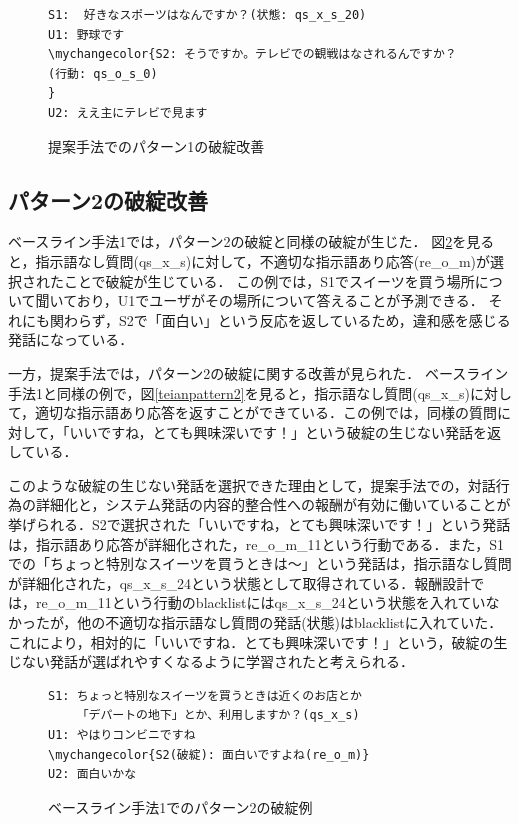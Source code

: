 \documentclass[12pt,a4paper,twoside,openany]{jbook}
\newcommand\mychangecolor[1]{\textcolor[rgb]{1,0,0}{\textbf{#1}}}
\begin{document}
\begin{figure}[htb]
\centering
\begin{screen}
\begin{Verbatim}[commandchars=\\\{\}]
S1:  好きなスポーツはなんですか？(状態: qs_x_s_20)
U1: 野球です
\mychangecolor{S2: そうですか。テレビでの観戦はなされるんですか？(行動: qs_o_s_0)
}
U2: ええ主にテレビで見ます
\end{Verbatim}
\end{screen}
\caption{提案手法でのパターン1の破綻改善}
\label{teianpattern1}
\end{figure}

\subsection*{パターン2の破綻改善}
ベースライン手法1では，パターン2の破綻と同様の破綻が生じた．
図\ref{baseline2pattern2}を見ると，指示語なし質問(qs\_x\_s)に対して，不適切な指示語あり応答(re\_o\_m)が選択されたことで破綻が生じている．
この例では，S1でスイーツを買う場所について聞いており，U1でユーザがその場所について答えることが予測できる．
それにも関わらず，S2で「面白い」という反応を返しているため，違和感を感じる発話になっている．

一方，提案手法では，パターン2の破綻に関する改善が見られた．
ベースライン手法1と同様の例で，図\ref{teianpattern2}を見ると，指示語なし質問(qs\_x\_s)に対して，適切な指示語あり応答を返すことができている．この例では，同様の質問に対して，「いいですね，とても興味深いです！」という破綻の生じない発話を返している．

このような破綻の生じない発話を選択できた理由として，提案手法での，対話行為の詳細化と，システム発話の内容的整合性への報酬が有効に働いていることが挙げられる．S2で選択された「いいですね，とても興味深いです！」という発話は，指示語あり応答が詳細化された，re\_o\_m\_11という行動である．また，S1での「ちょっと特別なスイーツを買うときは～」という発話は，指示語なし質問が詳細化された，qs\_x\_s\_24という状態として取得されている．報酬設計では，re\_o\_m\_11という行動のblacklistにはqs\_x\_s\_24という状態を入れていなかったが，他の不適切な指示語なし質問の発話(状態)はblacklistに入れていた．これにより，相対的に「いいですね．とても興味深いです！」という，破綻の生じない発話が選ばれやすくなるように学習されたと考えられる．




\begin{figure}[tb]
\centering
\begin{screen}
\begin{Verbatim}[commandchars=\\\{\}]
S1: ちょっと特別なスイーツを買うときは近くのお店とか
    「デパートの地下」とか、利用しますか？(qs_x_s)
U1: やはりコンビニですね
\mychangecolor{S2(破綻): 面白いですよね(re_o_m)}
U2: 面白いかな
\end{Verbatim}
\end{screen}
\caption{ベースライン手法1でのパターン2の破綻例}
\label{baseline2pattern2}
\end{figure}
\end{document}
